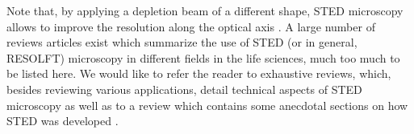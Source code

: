 Note that, by applying a depletion beam of a
different shape, STED microscopy allows to improve the resolution along the
optical axis \cite{Harke2008, Wildanger2009}. A large number of reviews articles exist
which summarize the use of STED (or in general, RESOLFT) microscopy in different
fields in the life sciences, much too much to be listed here. We would like to
refer the reader to exhaustive reviews, which, besides
reviewing various applications, detail technical aspects of STED microscopy
\cite{Turkowyd2016,Blom2017} as well as to a review which contains some
anecdotal sections on how STED was developed \cite{Sahl2019}.













